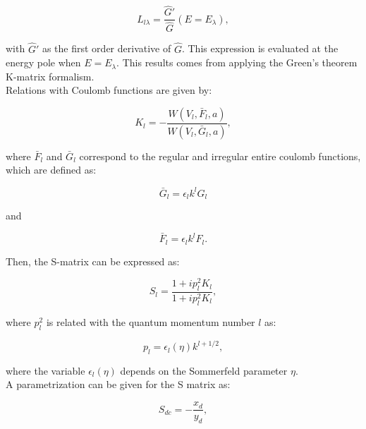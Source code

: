 \documentclass[openany]{book}
\begin{document}
\begin{equation}\label{eq:rmatrix_kmatrix_L}
	L_{l\lambda} = \frac{\hat G'}{\hat G}(E = E_\lambda), 
\end{equation}

with $\hat G'$ as the first order derivative of $\hat G$. This expression is evaluated at the energy pole when $E = E_\lambda$. This results comes from applying the Green's theorem K-matrix formalism. \\

Relations with Coulomb functions are given by:

\begin{equation}\label{eq:rmatrix_kmatrix_coulomb}
	K_l = - \frac{W(V_l, \bar F_l, a)}{W(V_l, \bar G_l, a)},
\end{equation}

where $\bar F_l$ and $\bar G_l$ correspond to the regular and irregular entire coulomb functions, which are defined as:

\begin{equation}\label{eq:rmatrix_kmatrix_coulombG_entire}
	\bar G_l = \epsilon_l k^l G_l
\end{equation}

and 

\begin{equation}\label{eq:rmatrix_kmatrix_coulombF_entire}
	\bar F_l = \epsilon_l k^l F_l.
\end{equation}

 Then, the S-matrix can be expressed as: 

\begin{equation}\label{eq:rmatrix_kmatrix_Smatrix}
	S_l = \frac{1 + ip^2_l K_l}{1 + ip^2_l K_l},
\end{equation}

where $p^2_l$ is related with the quantum momentum number $l$ as:

\begin{equation}\label{eq:rmatrix_kmatrix_pl}
	p_l = \epsilon_l(\eta) k^{l + 1/2},
\end{equation}

where the variable $\epsilon_l(\eta)$ depends on the Sommerfeld parameter $\eta$. \\

A parametrization can be given for the S matrix as:

\begin{equation}\label{eq:rmatrix_kmatrix_Smatrix_definition}
	S_{dc} = - \frac{x_d}{y_d},
\end{equation}
\end{document}

